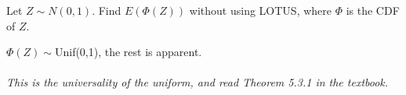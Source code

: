 

\setcounter{theorem}{30}
\begin{exercise}[BH.5.31] Let $Z \sim N(0, 1)$. Find $E(\Phi(Z))$ without using LOTUS, where $\Phi$ is the CDF of $Z$.
\begin{solution}
    $\Phi(Z)\sim$Unif(0,1), the rest is apparent.\\~\\
	\textit{This is the universality of the uniform, and read Theorem 5.3.1 in the textbook.}
\end{solution}
\end{exercise}


